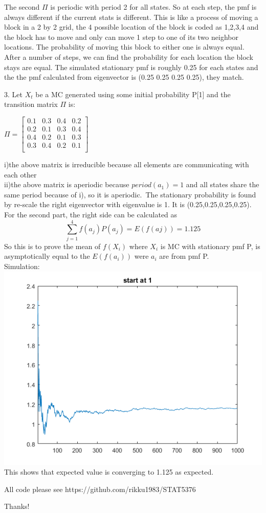 \documentclass[11pt]{scrartcl}
\begin{document}
The second $\Pi$ is periodic with period 2 for all states. So at each step, the pmf is always different if the current stats is different. This is like a process of moving a block in a 2 by 2 grid, the 4 possible location of the block is coded as 1,2,3,4 and the block has to move and only can move 1 step to one of its two neighbor locations. The probability of moving this block to either one is always equal. After a number of steps, we can find the probability for each location the block stays are equal. The simulated stationary pmf is roughly 0.25 for each states and the the pmf calculated from eigenvector is (0.25 0.25 0.25 0.25), they match.\\

\bigskip

3. Let $X_t$ be a MC generated using some initial probability P[1] and the transition matrix $\Pi$ is:\\
\begin{center}
$
\Pi=
\begin{bmatrix}
0.1&0.3&0.4&0.2\\
0.2&0.1&0.3&0.4\\
0.4&0.2&0.1&0.3\\
0.3&0.4&0.2&0.1\\
\end{bmatrix}
$
\end{center}
i)the above matrix is irreducible because all elements are communicating with each other\\
ii)the above matrix is aperiodic because $period(a_1)=1$ and all states share the same period because of i), so it is aperiodic.\
The stationary probability is found by re-scale the right eigenvector with eigenvalue is 1. It is (0.25,0.25,0.25,0.25).\\
For the second part, the right side can be calculated as
$$\sum_{j=1}^4f(a_j)P(a_j)=E(f(aj))=1.125$$
So this is to prove the mean of $f(X_i)$ where $X_i$ is MC with stationary pmf P, is asymptotically equal to the $E(f(a_i))$ were $a_i$ are from pmf P.\\
Simulation:\\
\includegraphics[scale=1]{hw2p4.png}\\
This shows that expected value is converging to 1.125 as expected.\\

\bigskip

All code please see https://github.com/rikku1983/STAT5376\\
\bigskip

Thanks!
\end{document}
